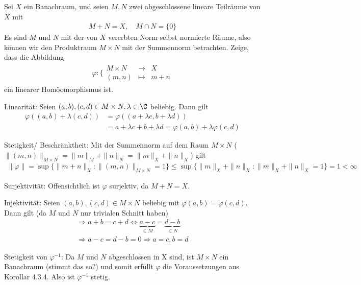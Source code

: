\begin{exercise}
Sei $X$ ein Banachraum, und seien $M,N$ zwei abgeschlossene lineare Teilräume von $X$ mit
\begin{align*}
  M + N = X, \quad M \cap N = \{0\}
\end{align*}
Es sind $M$ und $N$ mit der von $X$ vererbten Norm selbst normierte Räume, also
können wir den Produktraum $M \times N$ mit der Summennorm betrachten. Zeige,
dass die Abbildung
\begin{align*}
  \varphi: \bigg\{\begin{matrix}
    M \times N &\rightarrow& X \\
    (m,n) &\mapsto& m + n
  \end{matrix}
\end{align*}
ein linearer Homöomorphismus ist.
\end{exercise}
\begin{solution}
\item Linearität:
Seien $(a,b),(c,d)\in M\times N, \lambda \in \C $ beliebig. Dann gilt
\begin{align*}
  \varphi((a,b)+\lambda (c,d)) &= \varphi ((a+\lambda c, b + \lambda d)) \\
  &= a+\lambda c +  b + \lambda d = \varphi (a,b) + \lambda \varphi (c,d)
\end{align*}
 \item Stetigkeit/ Beschränktheit:
 Mit der Summennorm auf dem Raum $M \times N$ ($\|(m,n)\|_{M \times N} = \|m\|_M + \|n\|_N = \|m\|_X + \|n\|_X$) gilt
 \begin{align*}
      \|\varphi\| = \sup\{\|m+n\|_X : \|(m,n)\|_{M \times N} = 1\} \leq \sup\{\|m\|_X + \|n\|_X : \|m\|_X + \|n\|_X = 1\} = 1 < \infty
 \end{align*}

 \item Surjektivität:
 Offensichtlich ist $\varphi$ surjektiv, da $M + N = X$.

 \item Injektivität:
 Seien $(a,b),(c,d)\in M\times N$ beliebig mit $\varphi (a,b) = \varphi (c,d)$. Dann gilt (da $M$ und $N$ nur trivialen Schnitt haben)
 \begin{align*}
    \Rightarrow a+b = c+d \Leftrightarrow \underbrace{a-c}_{\in M} = \underbrace{d-b}_{\in N} \\
    \Rightarrow a-c = d-b = 0 \Rightarrow a=c, b=d
 \end{align*}

 \item Stetigkeit von $\varphi^{-1}$:
 Da $M$ und $N$ abgeschlossen in X sind, ist $M \times N$ ein Banachraum (stimmt das so?) und somit erfüllt $\varphi$ die Voraussetzungen aus Korollar 4.3.4. Also ist $\varphi^{-1}$ stetig.

\end{solution}
